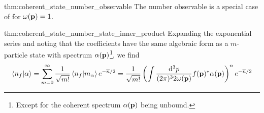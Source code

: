 \begin{delayedproof}{thm:coherent_state_number_observable}
	The number observable is a special case of  for $\omega(\vb{p})=1$.
\end{delayedproof}
\begin{delayedproof}{thm:coherent_state_number_state_inner_product}
	Expanding the exponential series and noting that the coefficients have the same algebraic form as a $m$-particle state with spectrum $\alpha(\vb{p})$\footnote{Except for the coherent spectrum $\alpha(\vb{p})$ being unbound.}, we find
	\begin{equation*}
		\braket{n_f}{\alpha}
		=
		\sum_{m=0}^\infty
		\frac{1}{\sqrt{m!}}
		\braket{n_f}{m_\alpha}
		e^{-\overline{n}/2}
		=
		\frac{1}{\sqrt{m!}}
		\left(
			\int\frac{\dd[3]{p}}{(2\pi)^32\omega(\vb{p})}
			f(\vb{p})^*
			\alpha(\vb{p})
		\right)^n
		e^{-\overline{n}/2}
	\end{equation*}
\end{delayedproof}
